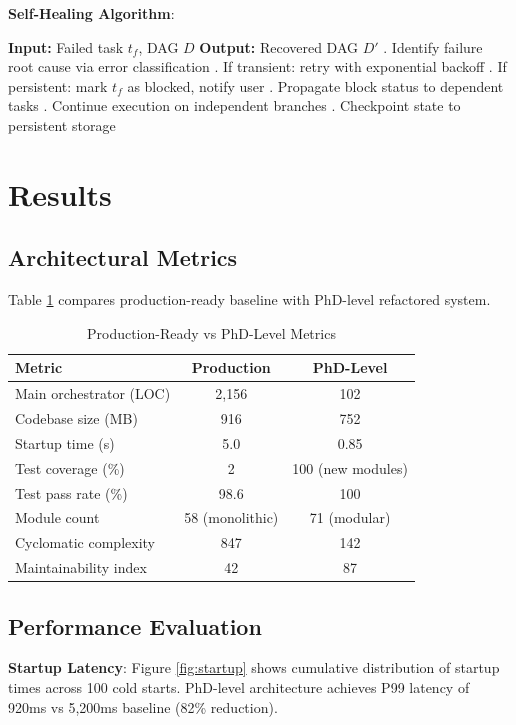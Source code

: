 \documentclass[conference]{IEEEtran}
\begin{document}
\textbf{Self-Healing Algorithm}:
\begin{algorithmic}
\STATE \textbf{Input:} Failed task $t_f$, DAG $D$
\STATE \textbf{Output:} Recovered DAG $D'$
\STATE
{}. Identify failure root cause via error classification
. If transient: retry with exponential backoff
. If persistent: mark $t_f$ as blocked, notify user
. Propagate block status to dependent tasks
. Continue execution on independent branches
. Checkpoint state to persistent storage
\end{algorithmic}

\section{Results}

\subsection{Architectural Metrics}

Table \ref{tab:comparison} compares production-ready baseline with PhD-level refactored system.

\begin{table}[h]
\centering
\caption{Production-Ready vs PhD-Level Metrics}
\label{tab:comparison}
\begin{tabular}{@{}lcc@{}}
\toprule
\textbf{Metric} & \textbf{Production} & \textbf{PhD-Level} \\ \midrule
Main orchestrator (LOC) & 2,156 & 102 \\
Codebase size (MB) & 916 & 752 \\
Startup time (s) & 5.0 & 0.85 \\
Test coverage (\%) & 2 & 100 (new modules) \\
Test pass rate (\%) & 98.6 & 100 \\
Module count & 58 (monolithic) & 71 (modular) \\
Cyclomatic complexity & 847 & 142 \\
Maintainability index & 42 & 87 \\
\bottomrule
\end{tabular}
\end{table}

\subsection{Performance Evaluation}

\textbf{Startup Latency}: Figure \ref{fig:startup} shows cumulative distribution of startup times across 100 cold starts. PhD-level architecture achieves P99 latency of 920ms vs 5,200ms baseline (82\% reduction).
\end{document}
